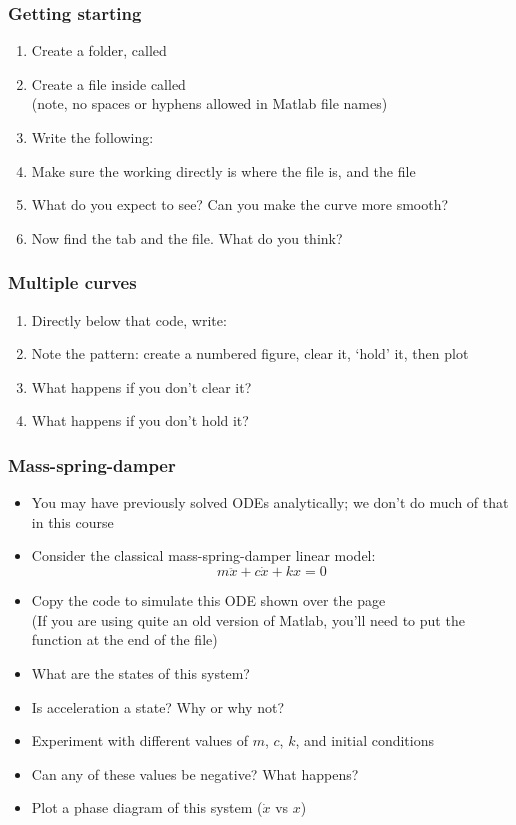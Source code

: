 \documentclass[9pt]{beamer-control}
\begin{document}
\begin{frame}
\frametitle{Getting starting}
\begin{enumerate}
\item Create a folder, called 
\item Create a file inside called \\(note, no spaces or hyphens allowed in Matlab file names)
\item Write the following:
\item Make sure the working directly is where the file is, and  the file
\item What do you expect to see? Can you make the curve more smooth?
\item Now find the  tab and  the file. What do you think?
\end{enumerate}
\end{frame}
\begin{frame}

\frametitle{Multiple curves}
\begin{enumerate}
\item Directly below that code, write:
\item Note the pattern: create a numbered figure, clear it, `hold' it, then plot
\item What happens if you don't clear it?
\item What happens if you don't hold it?
\end{enumerate}
\end{frame}


\begin{frame}
\frametitle{Mass-spring-damper}
\begin{itemize}
\item You may have previously solved ODEs analytically; we don't do much of that in this course
\item Consider the classical mass-spring-damper linear model:
\[
   m\ddot x + c\dot x + k x = 0
\] 
\item Copy the code to simulate this ODE shown over the page\\
 (If you are using quite an old version of Matlab, you'll need to put the function at the end of the file)
\item What are the states of this system?
\item Is acceleration a state? Why or why not?
\item Experiment with different values of $m$, $c$, $k$, and initial conditions
\item Can any of these values be negative? What happens?
\item Plot a phase diagram of this system ($\dot x$ vs $x$)
\end{itemize}
\end{frame}
\end{document}
